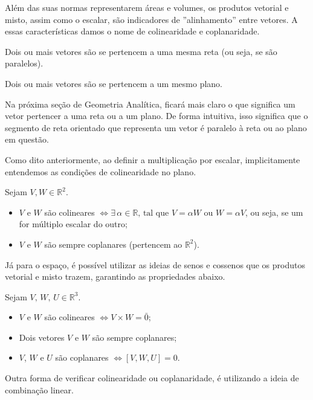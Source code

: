 \documentclass[../main.tex]{subfiles}
\begin{document}
		Além das suas normas representarem áreas e volumes, os produtos vetorial e misto, assim como o escalar, são indicadores de ''alinhamento'' entre vetores. A essas características damos o nome de colinearidade e coplanaridade.
		\begin{definicao}
			Dois ou mais vetores são  se pertencem a uma mesma reta (ou seja, se são paralelos). 
		\end{definicao}
		\begin{definicao}
			Dois ou mais vetores são  se pertencem a um mesmo plano.
		\end{definicao}
		Na próxima seção de Geometria Analítica, ficará mais claro o que significa um vetor pertencer a uma reta ou a um plano. De forma intuitiva, isso significa que o segmento de reta orientado que representa um vetor é paralelo à reta ou ao plano em questão.
		
		Como dito anteriormente, ao definir a multiplicação por escalar, implicitamente entendemos as condições de colinearidade no plano.
		
		\begin{proposicao}
			Sejam $V, W\in \mathbb{R}^2$.
			\begin{itemize}
				\item $V$ e $W$ são colineares $\Leftrightarrow \exists \, \alpha \in \mathbb{R}\text{, tal que } V=\alpha W \text{ ou } W=\alpha V$, ou seja, se um for múltiplo escalar do outro;
				\item $V$ e $W$ são sempre coplanares (pertencem ao $\mathbb{R}^2$).
			\end{itemize}
		\end{proposicao}
		
		Já para o espaço, é possível utilizar as ideias de senos e cossenos que os produtos vetorial e misto trazem, garantindo as propriedades abaixo.
		\begin{proposicao}
			Sejam $V,\, W,\, U\in \mathbb{R}^3$.
			\begin{itemize}
				\item $V$ e $W$ são colineares $\Leftrightarrow V\times W=\bar{0}$;
				\item Dois vetores $V$ e $W$ são sempre coplanares;
				\item $V$, $W$ e $U$ são coplanares $\Leftrightarrow [V, W, U]=0$.
			\end{itemize}
		\end{proposicao}
		
		Outra forma de verificar colinearidade ou coplanaridade, é utilizando a ideia de combinação linear.
		
\end{document}
